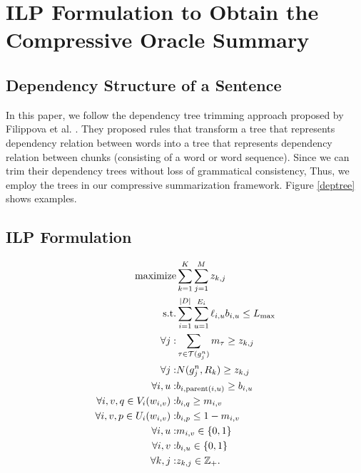 \documentclass[11pt,a4paper]{article}
\begin{document}
\section{ILP Formulation to Obtain the Compressive Oracle Summary}

\subsection{Dependency Structure of a Sentence}

In this paper, we follow the dependency tree trimming approach proposed by 
Filippova et al. \citeyearpar{filippova08,filippova:2013}.
They proposed rules that transform a tree that represents dependency relation between
words into a tree that represents dependency relation between chunks 
(consisting of a word or word sequence). 
Since we can trim their dependency trees without loss of grammatical consistency,
Thus, we employ the trees in our compressive summarization
framework.
Figure \ref{deptree} shows examples.

 
\subsection{ILP Formulation}

\begin{eqnarray}
   \text{maximize}
  & \displaystyle\sum_{k=1}^{K}\sum_{j=1}^{M} z_{k,j}\\
 \text{s.t.} & \displaystyle\sum_{i=1}^{|D|} \sum_{u=1}^{E_i}\ell_{i,u} b_{i,u} \le L_{\rm max}\\
\forall j :      & \displaystyle\sum_{\tau \in {\cal T}(g_j^n)} m_{\tau} \ge z_{k,j}\\
\forall j :      &  N(g_j^n,R_k) \ge z_{k,j}\\
\forall i,u :    &  b_{i,{\rm parent}(i,u)} \ge b_{i,u}\\
\forall i, v, q \in V_i(w_{i,v}) : &  b_{i,q} \ge m_{i,v}\\
\forall i, v, p \in U_i(w_{i,v}) : &  b_{i,p} \le 1- m_{i,v}\\
\displaystyle\forall i,u :   &  m_{i,v} \in \{0,1\}\\
\displaystyle\forall i,v :   &  b_{i,u} \in \{0,1\}\\
\displaystyle\forall k,j :   &  z_{k,j} \in \mathbb{Z}_{+}.
\end{eqnarray}
\end{document}
